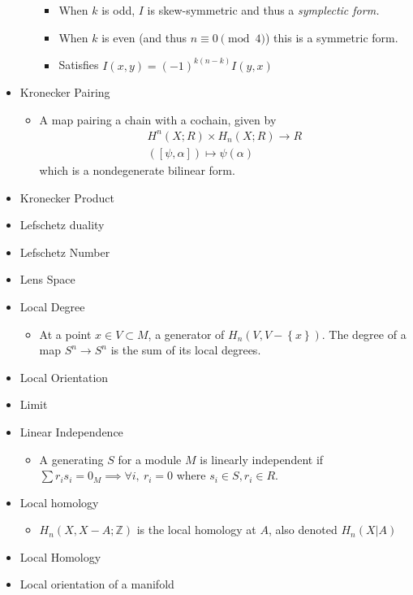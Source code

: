 \begin{itemize}
\begin{itemize}
    \begin{itemize}
    \tightlist
    \item
      When \(k\) is odd, \(I\) is skew-symmetric and thus a
      \emph{symplectic form.}
    \item
      When \(k\) is even (and thus \(n \equiv 0 \pmod 4\)) this is a
      symmetric form.
    \item
      Satisfies \(I(x,y) = (-1)^{k(n-k)} I(y, x)\)
    \end{itemize}
  \end{itemize}
\item
  Kronecker Pairing

  \begin{itemize}
  \tightlist
  \item
    A map pairing a chain with a cochain, given by
    \begin{align*}H^n(X; R) \times H_n(X; R) \to R \\ ([\psi, \alpha]) \mapsto \psi(\alpha)\end{align*}
    which is a nondegenerate bilinear form.
  \end{itemize}
\item
  Kronecker Product
\item
  Lefschetz duality
\item
  Lefschetz Number
\item
  Lens Space
\item
  Local Degree

  \begin{itemize}
  \tightlist
  \item
    At a point \(x \in V \subset M\), a generator of
    \(H_n(V, V-\left\{{x}\right\})\). The degree of a map
    \(S^n \to S^n\) is the sum of its local degrees.
  \end{itemize}
\item
  Local Orientation
\item
  Limit
\item
  Linear Independence

  \begin{itemize}
  \tightlist
  \item
    A generating \(S\) for a module \(M\) is linearly independent if
    \(\sum r_i s_i = 0_M \implies \forall i,~r_i = 0\) where
    \(s_i\in S, r_i \in R\).
  \end{itemize}
\item
  Local homology

  \begin{itemize}
  \tightlist
  \item
    \(H_n(X, X-A; {\mathbb{Z}})\) is the local homology at \(A\), also
    denoted \(H_n(X \mathrel{\Big|}A)\)
  \end{itemize}
\item
  Local Homology
\item
  Local orientation of a manifold


\end{itemize}
